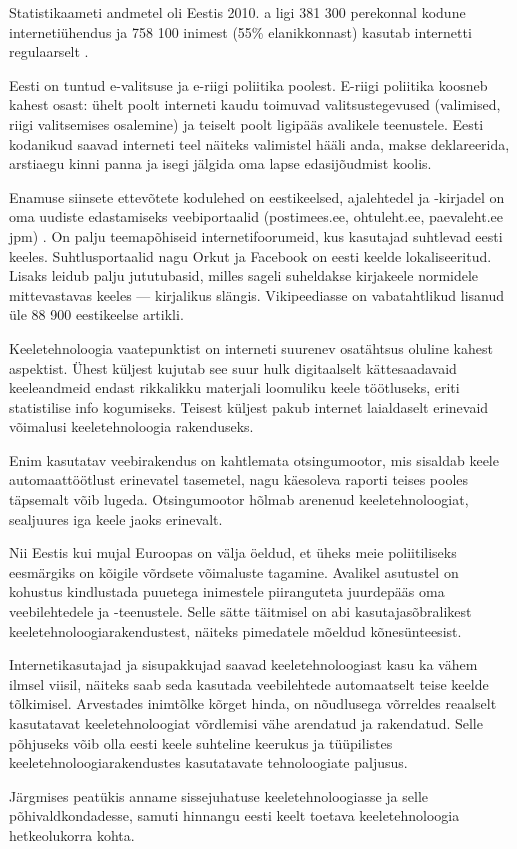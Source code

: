 \begin{multicols}{2}
Statistikaameti andmetel oli Eestis 2010. a ligi 381 300 perekonnal kodune internetiühendus ja 758 100 inimest (55\% elanikkonnast) kasutab internetti regulaarselt \cite{Stat3}.


Eesti on tuntud e-valitsuse ja e-riigi polii\-tika poolest. 
E-riigi poliitika koosneb kahest osast: ühelt poolt interneti kaudu toimuvad valitsustegevused (valimised, rii\-gi valitsemises osalemine) ja teiselt poolt ligipääs avalikele teenustele. 
Eesti kodanikud saavad interneti teel näiteks valimistel hääli anda, makse deklareerida, arstiaegu kinni panna ja isegi jälgida oma lapse edasijõudmist koolis.



Enamuse siinsete ettevõtete kodulehed on eestikeelsed, ajalehtedel ja -kirjadel on oma uudiste edastamiseks veebi\-portaalid (postimees.ee, ohtuleht.ee, paevaleht.ee jpm) \cite{Neti}. 
On palju teemapõhiseid  internetifoorumeid, kus kasutajad suhtlevad eesti keeles.
Suhtlusportaalid nagu Orkut ja Facebook on eesti keelde lokaliseeritud. 
Lisaks leidub palju jututubasid, milles sageli suheldakse kirjakeele
normidele mittevastavas keeles --- kirjalikus slängis. 
Vikipeediasse on vabatahtlikud lisanud üle 88 900 eestikeelse artikli.

Keeletehnoloogia vaatepunktist on interneti suurenev osatähtsus oluline kahest aspektist. 
Ühest küljest kujutab see suur hulk digitaalselt kättesaadavaid keeleandmeid endast rikkalikku materjali loomuliku keele töötluseks, eriti statistilise info kogumiseks. 
Teisest küljest pakub internet laialdaselt erinevaid võimalusi keeletehnoloogia rakenduseks.

Enim kasutatav veebirakendus on kahtle\-mata otsingumootor, mis sisaldab keele automaattöötlust erinevatel tasemetel, nagu käesoleva raporti teises pooles täpsemalt võib lugeda. 
Otsingumootor hõlmab arenenud keeletehnoloogiat, sealjuures iga keele jaoks erinevalt.

Nii Eestis kui mujal Euroopas on välja öeldud, et üheks meie poliitiliseks eesmärgiks on kõigile võrdsete võimaluste tagamine.
Avalikel asutustel on kohustus kindlustada puuetega inimestele piiranguteta juurdepääs oma veebilehtedele ja -teenustele. 
Selle sätte täitmisel on abi kasutajasõbralikest keeletehnoloogiarakendustest, näi\-teks pimedatele mõeldud kõnesünteesist.

Internetikasutajad ja sisupakkujad saavad keeletehnoloogiast kasu ka vähem ilmsel viisil, näiteks saab seda kasutada veebi\-lehtede automaatselt teise keelde tõlkimisel. 
Arvestades inimtõlke kõrget hinda, on nõudlusega võrreldes reaalselt kasutatavat keeletehnoloogiat võrdlemisi vähe arendatud ja rakendatud. 
Selle põhjuseks võib olla eesti keele suhteline keerukus ja tüüpilistes keeletehnoloogiarakendustes kasutatavate tehnoloogiate paljusus.

Järgmises peatükis anname sissejuhatuse keeletehnoloogiasse ja selle põhivaldkondadesse, samuti hinnangu eesti keelt toetava keeletehnoloogia hetkeolukorra kohta.

\end{multicols}

